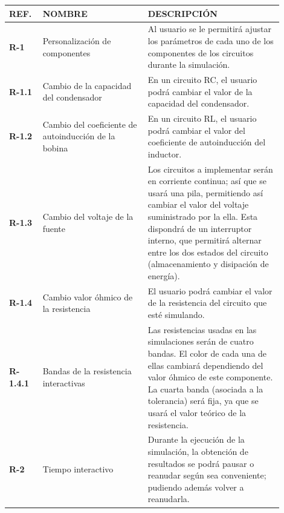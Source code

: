 \documentclass[../main.tex]{subfiles}
\begin{document}
\begin{longtable}{|| p{0.1\linewidth} | p{0.35\linewidth} |  p{0.45\linewidth} ||}
            \hline
            \textbf{REF.} & \textbf{NOMBRE} & \textbf{DESCRIPCIÓN} \\ \hline
           
            \textbf{R-1} & Personalización de componentes & Al usuario se le permitirá ajustar los parámetros de cada uno de los componentes de los circuitos durante la simulación. \\ \hline
            
            \textbf{R-1.1} & Cambio de la capacidad del condensador & En un circuito RC, el usuario podrá cambiar el valor de la capacidad del condensador. \\ \hline
            
            \textbf{R-1.2} & Cambio del coeficiente de autoinducción de la bobina & En un circuito RL, el usuario podrá cambiar el valor del coeficiente de autoinducción del inductor.  \\ \hline
            
            \textbf{R-1.3} & Cambio del voltaje de la fuente & Los circuitos a implementar serán en corriente continua; así que se usará una pila, permitiendo así cambiar el valor del voltaje suministrado por la ella. Esta dispondrá de un interruptor interno, que permitirá alternar entre los dos estados del circuito (almacenamiento y disipación de energía). \\ \hline
            
            \textbf{R-1.4} & Cambio valor óhmico de la resistencia & El usuario podrá cambiar el valor de la resistencia del circuito que esté simulando. \\ \hline
            
            \textbf{R-1.4.1} & Bandas de la resistencia interactivas & Las resistencias usadas en las simulaciones serán de cuatro bandas. El color de cada una de ellas cambiará dependiendo del valor óhmico de este componente. La cuarta banda (asociada a la tolerancia) será fija, ya que se usará el valor teórico de la resistencia. \\ \hline
            
            \textbf{R-2} & Tiempo interactivo & Durante la ejecución de la simulación, la obtención de resultados se podrá pausar o reanudar según sea conveniente; pudiendo además volver a reanudarla. \\ \hline
            

\end{longtable}
\end{document}
